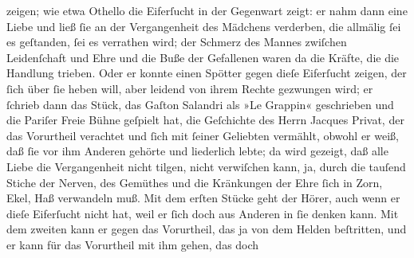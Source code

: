 \begin{ledgroupsized}[t]{13cm}
{{{                     zeigen; wie etwa Othello die Eiferſucht in
                     der Gegenwart zeigt: er nahm dann eine Liebe und ließ ſie an der Vergangenheit
                     des Mädchens verderben, die allmälig ſei es geſtanden, ſei es verrathen wird;
                     der Schmerz des Mannes zwiſchen Leidenſchaft und Ehre und die Buße der
                     Gefallenen waren da die Kräfte, die die Handlung trieben. Oder er konnte einen
                     Spötter gegen dieſe Eiferſucht zeigen, der ſich über ſie heben will, aber
                     leidend von ihrem Rechte gezwungen wird; er ſchrieb dann das Stück, das Gaſton Salandri als »Le
                        Grappin« geschrieben und die Pariſer Freie Bühne
                     geſpielt hat, die Geſchichte des Herrn Jacques Privat, der das Vorurtheil verachtet und ſich
                     mit ſeiner Geliebten vermählt, obwohl er weiß, daß ſie vor ihm Anderen gehörte
                     und liederlich lebte; da wird gezeigt, daß alle Liebe die Vergangenheit nicht
                     tilgen, nicht verwiſchen kann, ja, durch die tauſend Stiche der Nerven, des
                     Gemüthes und die Kränkungen der Ehre ſich in Zorn, Ekel, Haß verwandeln muß.
                     Mit dem erſten Stücke
                     geht der Hörer, auch wenn er dieſe Eiferſucht nicht hat, weil er ſich doch aus
                     Anderen in ſie denken kann. Mit dem zweiten kann er gegen das Vorurtheil, das ja von dem
                     Helden beſtritten, und er kann für das Vorurtheil mit ihm gehen, das doch
}}}
\end{ledgroupsized}
